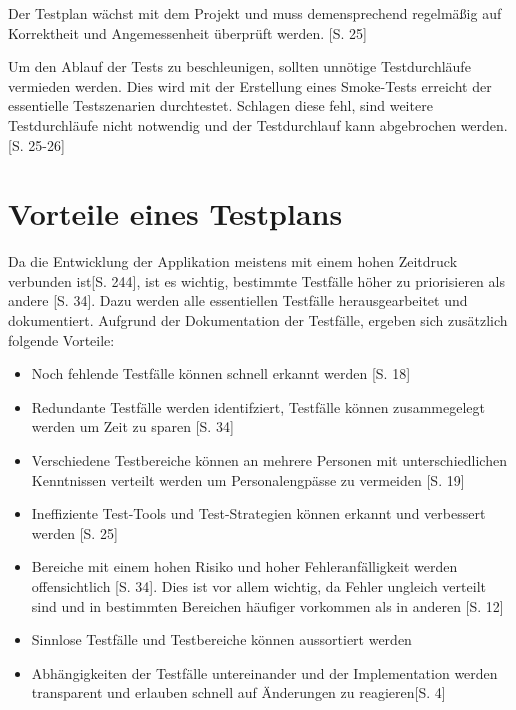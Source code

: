\documentclass[a4paper,bibtotoc,oneside]{scrbook}
\begin{document}
Der Testplan wächst mit dem Projekt und muss demensprechend regelmäßig auf Korrektheit und Angemessenheit überprüft werden. \cite{eval_regression}[S. 25] 

Um den Ablauf der Tests zu beschleunigen, sollten unnötige Testdurchläufe vermieden werden. Dies wird mit der Erstellung eines Smoke-Tests erreicht der essentielle Testszenarien durchtestet. Schlagen diese fehl, sind weitere Testdurchläufe nicht notwendig und der Testdurchlauf kann abgebrochen werden. \cite{eval_regression}[S. 25-26]


\section{Vorteile eines Testplans}

Da die Entwicklung der Applikation meistens mit einem hohen Zeitdruck verbunden ist\cite{software_qual}[S. 244], ist es wichtig, bestimmte Testfälle höher zu priorisieren als andere \cite{testing_apps_on_web}[S. 34]. Dazu werden alle essentiellen Testfälle herausgearbeitet und dokumentiert. Aufgrund der Dokumentation der Testfälle, ergeben sich zusätzlich folgende Vorteile:

\begin{itemize}
	\item Noch fehlende Testfälle können schnell erkannt werden \cite{test_large_systems}[S. 18]
	\item Redundante Testfälle werden identifziert, Testfälle können zusammegelegt werden um Zeit zu sparen \cite{testing_apps_on_web}[S. 34]
	\item Verschiedene Testbereiche können an mehrere Personen mit unterschiedlichen Kenntnissen verteilt werden um Personalengpässe zu vermeiden \cite{test_large_systems}[S. 19]
	\item Ineffiziente Test-Tools und Test-Strategien können erkannt und verbessert werden \cite{eval_regression}[S. 25]
	\item Bereiche mit einem hohen Risiko und hoher Fehleranfälligkeit werden offensichtlich \cite{testing_apps_on_web}[S. 34]. Dies ist vor allem wichtig, da Fehler ungleich verteilt sind und in bestimmten Bereichen häufiger vorkommen als in anderen \cite{eval_regression}[S. 12]
	\item Sinnlose Testfälle und Testbereiche können aussortiert werden 
	\item Abhängigkeiten der Testfälle untereinander und der Implementation werden transparent und erlauben schnell auf Änderungen zu reagieren\cite{test_auto}[S. 4]
\end{itemize}
\end{document}
